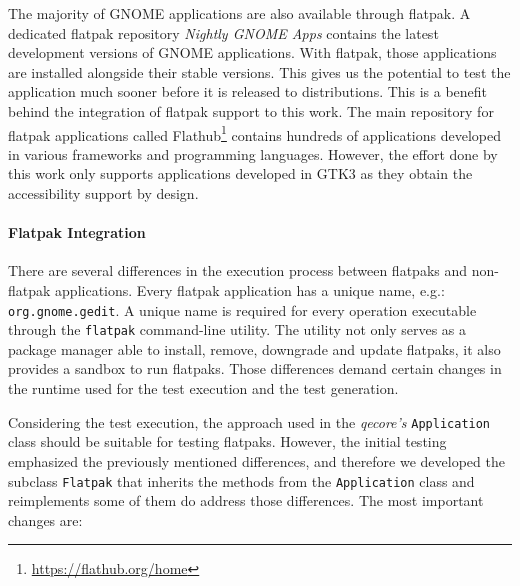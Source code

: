 The majority of GNOME applications are also available through flatpak. A dedicated flatpak repository \textit{Nightly GNOME Apps} contains the latest development versions of GNOME applications. With flatpak, those applications are installed alongside their stable versions. This gives us the potential to test the application much sooner before it is released to distributions. This is a benefit behind the integration of flatpak support to this work. The main repository for flatpak applications called Flathub\footnote{\url{https://flathub.org/home}} contains hundreds of applications developed in various frameworks and programming languages. However, the effort done by this work only supports applications developed in GTK3 as they obtain the accessibility support by design.

\paragraph{Flatpak Integration} There are several differences in the execution process between flatpaks and non-flatpak applications. Every flatpak application has a unique name, e.g.: \texttt{org.gnome.gedit}. A unique name is required for every operation executable through the \texttt{flatpak} command-line utility. The utility not only serves as a package manager able to install, remove, downgrade and update flatpaks, it also provides a sandbox to run flatpaks. Those differences demand certain changes in the runtime used for the test execution and the test generation. 

Considering the test execution, the approach used in the \textit{qecore's} \texttt{Application} class should be suitable for testing flatpaks. However, the initial testing emphasized the previously mentioned differences, and therefore we developed the subclass \texttt{Flatpak} that inherits the methods from the \texttt{Application} class and reimplements some of them do address those differences. The most important changes are:

